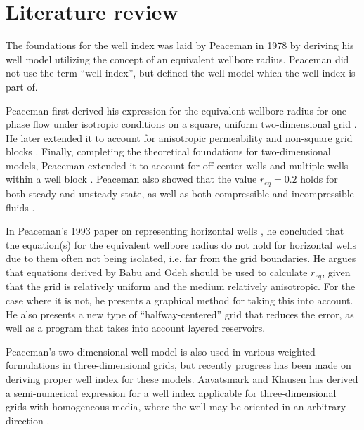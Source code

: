 
\section{Literature review} %
\label{sec:literature_review}
The foundations for the well index was laid by Peaceman in 1978 \cite{Aavatsmark2003Well} by deriving his well model utilizing the concept of an equivalent wellbore radius. Peaceman did not use the term ``well index'', but defined the well model which the well index is part of.

Peaceman first derived his expression for the equivalent wellbore radius for one-phase flow under isotropic conditions on a square, uniform two-dimensional grid \cite{Peaceman1978Interpretation}. He later extended it to account for anisotropic permeability and non-square grid blocks \cite{Peaceman1983Interpretation}. Finally, completing the theoretical foundations for two-dimensional models, Peaceman extended it to account for off-center wells and multiple wells within a well block \cite{Peaceman1990Interpretation}. Peaceman also showed that the value $r_{eq}=0.2$ holds for both steady and unsteady state, as well as both compressible and incompressible fluids \cite{Peaceman1978Interpretation}.

In Peaceman's 1993 paper on representing horizontal wells \cite{Peaceman1993Representation}, he concluded that the equation(s) for the equivalent wellbore radius do not hold for horizontal wells due to them often not being isolated, i.e. far from the grid boundaries. He argues that equations derived by Babu and Odeh \cite{Babu1991Relation} should be used to calculate $r_{eq}$, given that the grid is relatively uniform and the medium relatively anisotropic. For the case where it is not, he presents a graphical method for taking this into account. He also presents a new type of ``halfway-centered'' grid that reduces the error, as well as a program that takes into account layered reservoirs.

Peaceman's two-dimensional well model is also used in various weighted formulations in three-dimensional grids, but recently progress has been made on deriving proper well index for these models. Aavatsmark and Klausen has derived a semi-numerical expression for a well index applicable for three-dimensional grids with homogeneous media, where the well may be oriented in an arbitrary direction \cite{Aavatsmark2003Well}.

